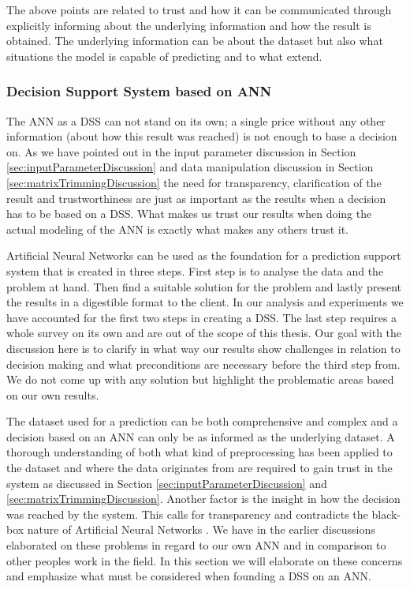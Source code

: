 The above points are related to trust and how it can be communicated through explicitly informing about the underlying information and how the result is obtained. The underlying information can be about the dataset but also what situations the model is capable of predicting and to what extend.

\subsubsection{Decision Support System based on ANN}
The ANN as a DSS can not stand on its own; a single price without any other information (about how this result was reached) is not enough to base a decision on. As we have pointed out in the input parameter discussion in Section \ref{sec:inputParameterDiscussion} and data manipulation discussion in Section \ref{sec:matrixTrimmingDiscussion} the need for transparency, clarification of the result and trustworthiness are just as important as the results when a decision has to be based on a DSS. What makes us trust our results when doing the actual modeling of the ANN is exactly what makes any others trust it.

Artificial Neural Networks can be used as the foundation for a prediction support system that is created in three steps\cite{shim2002past}. First step is to analyse the data and the problem at hand. Then find a suitable solution for the problem and lastly present the results in a digestible format to the client. In our analysis and experiments we have accounted for the first two steps in creating a DSS. The last step requires a whole survey on its own and are out of the scope of this thesis. Our goal with the discussion here is to clarify in what way our results show challenges in relation to decision making and what preconditions are necessary before the third step from\cite{shim2002past}. We do not come up with any solution but highlight the problematic areas based on our own results. 

The dataset used for a prediction can be both comprehensive and complex and a decision based on an ANN can only be as informed as the underlying dataset. A thorough understanding of both what kind of preprocessing has been applied to the dataset and where the data originates from are required to gain trust in the system as discussed in Section \ref{sec:inputParameterDiscussion} and \ref{sec:matrixTrimmingDiscussion}. Another factor is the insight in how the decision was reached by the system. This calls for transparency and contradicts the black-box nature of Artificial Neural Networks \cite{fromBlackBoxToTransparentBox}. We have in the earlier discussions elaborated on these problems in regard to our own ANN and in comparison to other peoples work in the field. In this section we will elaborate on these concerns and emphasize what must be considered when founding a DSS on an ANN.

